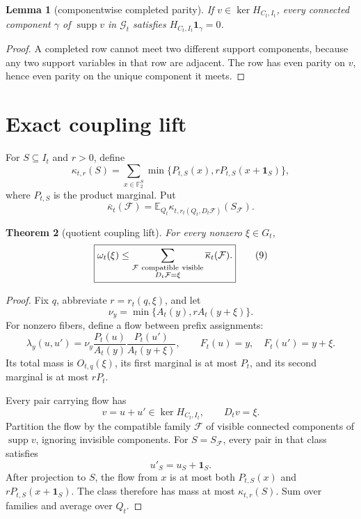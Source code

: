 \documentclass[11pt]{article}
\newtheorem{theorem}{Theorem}
\newtheorem{lemma}[theorem]{Lemma}
\newcommand{\F}{\mathbb F}
\newcommand{\E}{\mathbb E}
\newcommand{\1}{\mathbf 1}
\begin{document}
\begin{lemma}[componentwise completed parity]
If \(v\in\ker H_{C_t,I_t}\), every connected component \(\gamma\) of
\(\operatorname{supp}v\) in \(\mathcal G_t\) satisfies
\(H_{C_t,I_t}\1_\gamma=0\).
\end{lemma}

\begin{proof}
A completed row cannot meet two different support components, because any
two support variables in that row are adjacent.  The row has even parity on
\(v\), hence even parity on the unique component it meets.
\end{proof}

\section{Exact coupling lift}

For \(S\subseteq I_t\) and \(r>0\), define
\[
 \kappa_{t,r}(S)
 =
 \sum_{x\in\F_2^S}
 \min\{P_{t,S}(x),rP_{t,S}(x+\1_S)\},
\tag{7}
\]
where \(P_{t,S}\) is the product marginal.  Put
\[
 \overline\kappa_t(\mathcal F)
 =
 \E_{Q_t}
 \kappa_{t,r_t(Q_t,D_t\mathcal F)}(S_{\mathcal F}).
\tag{8}
\]

\begin{theorem}[quotient coupling lift]
For every nonzero \(\xi\in G_t\),
\[
\boxed{
 \omega_t(\xi)
 \le
 \sum_{\substack{
 \mathcal F\ {\rm compatible\ visible}\\
 D_t\mathcal F=\xi}}
 \overline\kappa_t(\mathcal F).}
\tag{9}
\]
\end{theorem}

\begin{proof}
Fix \(q\), abbreviate \(r=r_t(q,\xi)\), and let
\[
 \nu_y=\min\{A_t(y),rA_t(y+\xi)\}.
\]
For nonzero fibers, define a flow between prefix assignments:
\[
 \lambda_y(u,u')
 =
 \nu_y
 \frac{P_t(u)}{A_t(y)}
 \frac{P_t(u')}{A_t(y+\xi)},
 \qquad F_t(u)=y,\quad F_t(u')=y+\xi.
\tag{10}
\]
Its total mass is \(O_{t,q}(\xi)\), its first marginal is at most \(P_t\),
and its second marginal is at most \(rP_t\).

Every pair carrying flow has
\[
 v=u+u'\in\ker H_{C_t,I_t},\qquad D_tv=\xi.
\tag{11}
\]
Partition the flow by the compatible family \(\mathcal F\) of visible
connected components of \(\operatorname{supp}v\), ignoring invisible
components.  For \(S=S_{\mathcal F}\), every pair in that class satisfies
\[
 u'_S=u_S+\1_S.
\]
After projection to \(S\), the flow from \(x\) is at most both
\(P_{t,S}(x)\) and \(rP_{t,S}(x+\1_S)\).  The class therefore has mass at
most \(\kappa_{t,r}(S)\).  Sum over families and average over \(Q_t\).
\end{proof}
\end{document}
